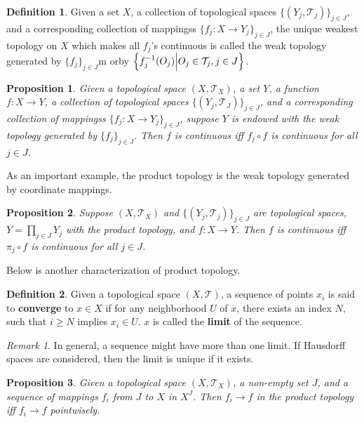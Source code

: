\documentclass[openany]{book}
\newtheorem{proposition}{Proposition}[chapter]
\theoremstyle{definition}
\newtheorem{definition}{Definition}[chapter]
\theoremstyle{remark}
\newtheorem*{remark}{Remark}
\begin{document}
\begin{definition}
    Given a set $X$, a collection of topological spaces $\{(Y_j,\mathcal{T}_j)\}_{j\in J}$, and a corresponding collection of mappingss $\{f_j:X\to Y_j\}_{j\in J}$, the unique weakest topology on $X$ which makes all $f_j$'s continuous is called the weak topology generated by $\{f_j\}_{j\in J}$m orby $\cbr{f_j^{-1}(O_j)\middle|O_j\in \mathcal{T}_j,j\in J}$.
\end{definition}
\begin{proposition}
    Given a topological space $(X,\mathcal{T}_X)$, a set $Y$, a function $f:X\to Y$, a collection of topological spaces $\{(Y_j,\mathcal{T}_J)\}_{j\in J}$, and a corresponding collection of mappingss $\{f_j:X\to Y_j\}_{j\in J}$, suppose $Y$ is endowed with the weak topology generated by $\{f_j\}_{j\in J}$. Then $f$ is continuous iff $f_j\circ f$ is continuous for all $j\in J$.
\end{proposition}
As an important example, the product topology is the weak topology generated by coordinate mappings.
\begin{proposition}
    Suppose $(X,\mathcal{T}_X)$ and $\{(Y_j,\mathcal{T}_j)\}_{j\in J}$ are topological spaces, $Y=\prod_{j\in J}Y_j$ with the product topology, and $f:X\to Y$. Then $f$ is continuous iff $\pi_j\circ f$ is continuous for all $j\in J$.
\end{proposition}
Below is another characterization of product topology.
\begin{definition}
    Given a topological space $(X,\mathcal{T})$, a sequence of points $x_i$ is said to \textbf{converge} to $x\in X$ if for any neighborhood $U$ of $x$, there exists an index $N$, such that $i\ge N$ implies $x_i\in U$. $x$ is called the \textbf{limit} of the sequence.
\end{definition}
\begin{remark}
    In general, a sequence might have more than one limit. If Hausdorff spaces are considered, then the limit is unique if it exists.
\end{remark}
\begin{proposition}
    Given a topological space $(X,\mathcal{T}_X)$, a non-empty set $J$, and a sequence of mappings $f_i$ from $J$ to $X$ in $X^J$. Then $f_i\to f$ in the product topology iff $f_i\to f$ pointwisely.
\end{proposition}
\end{document}
